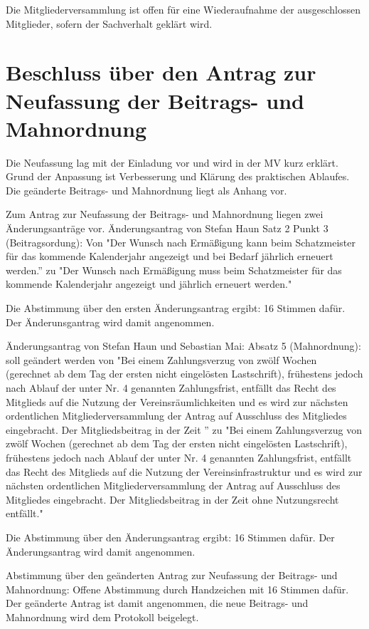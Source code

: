 \documentclass[a4paper,12pt,titlepage]{scrartcl}
\begin{document}
Die Mitgliederversammlung ist offen für eine Wiederaufnahme der ausgeschlossen Mitglieder, sofern der Sachverhalt geklärt wird.


\section{Beschluss über den Antrag zur Neufassung der Beitrags- und Mahnordnung}

Die Neufassung lag mit der Einladung vor und wird in der MV kurz erklärt. Grund der Anpassung ist Verbesserung und Klärung des praktischen Ablaufes. Die geänderte Beitrags- und Mahnordnung liegt als Anhang vor.

Zum Antrag zur Neufassung der Beitrags- und Mahnordnung liegen zwei Änderungsanträge vor.
Änderungsantrag von Stefan Haun Satz 2 Punkt 3 (Beitragsordung): Von
"Der Wunsch nach Ermäßigung kann beim Schatzmeister für das
kommende Kalenderjahr angezeigt und bei Bedarf jährlich erneuert werden.'' zu
"Der Wunsch nach Ermäßigung muss beim Schatzmeister für das
kommende Kalenderjahr angezeigt und jährlich erneuert werden."

Die Abstimmung über den ersten Änderungsantrag ergibt: 16 Stimmen dafür. Der Änderunsgantrag wird damit angenommen.

Änderungsantrag von Stefan Haun und Sebastian Mai:
Absatz 5 (Mahnordnung): soll geändert werden von
"Bei einem Zahlungsverzug von zwölf Wochen (gerechnet ab dem Tag der ersten nicht
eingelösten Lastschrift), frühestens jedoch nach Ablauf der unter Nr. 4 genannten
Zahlungsfrist, entfällt das Recht des Mitglieds auf die Nutzung der
Vereinsräumlichkeiten und es wird zur nächsten ordentlichen Mitgliederversammlung
der Antrag auf Ausschluss des Mitgliedes eingebracht. Der Mitgliedsbeitrag in der Zeit
'' zu
"Bei einem Zahlungsverzug von zwölf Wochen (gerechnet ab dem Tag der ersten nicht
eingelösten Lastschrift), frühestens jedoch nach Ablauf der unter Nr. 4 genannten
Zahlungsfrist, entfällt das Recht des Mitglieds auf die Nutzung der
Vereinsinfrastruktur und es wird zur nächsten ordentlichen Mitgliederversammlung
der Antrag auf Ausschluss des Mitgliedes eingebracht. Der Mitgliedsbeitrag in der Zeit ohne Nutzungsrecht entfällt."


Die Abstimmung über den Änderungsantrag ergibt: 16 Stimmen dafür. Der Änderungsantrag wird damit angenommen.


Abstimmung über den geänderten Antrag zur Neufassung der Beitrags- und Mahnordnung: Offene Abstimmung durch Handzeichen mit 16 Stimmen dafür. Der geänderte Antrag ist damit angenommen, die neue Beitrags- und Mahnordnung wird dem Protokoll beigelegt.
\end{document}
